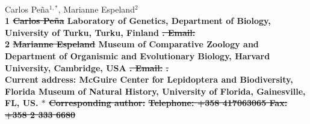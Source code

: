 \documentclass[10pt,letterpaper]{article} %
\date{}
\providecommand{\DIFadd}[1]{{\protect\color{blue}\uwave{#1}}} %
\providecommand{\DIFdel}[1]{{\protect\color{red}\sout{#1}}}                      %
\providecommand{\DIFaddbegin}{} %
\providecommand{\DIFaddend}{} %
\providecommand{\DIFdelbegin}{} %
\providecommand{\DIFdelend}{} %
\begin{document}
\DIFaddbegin \vspace*{0.35in}

\DIFaddend \begin{flushleft}
{\Large
\DIFdelbegin %
\DIFdelend \DIFaddbegin \textbf{}
\DIFaddend }
\DIFdelbegin %
\DIFdelend \DIFaddbegin \newline
\\
\DIFaddend Carlos Pe\~na\DIFdelbegin \DIFdel{$^{1,\ast}$}\DIFdelend \DIFaddbegin \DIFadd{\textsuperscript{1,*}}\DIFaddend ,
Marianne Espeland\DIFdelbegin \DIFdel{$^{2}$
}\DIFdelend \DIFaddbegin \DIFadd{\textsuperscript{2,\textcurrency}
}\DIFaddend \\
\bf{1} \DIFdelbegin \DIFdel{Carlos Pe\~na }\DIFdelend Laboratory of Genetics, Department of Biology, University of Turku, Turku, Finland
\DIFdelbegin \DIFdel{. Email: }%
\DIFdelend \\
\bf{2} \DIFdelbegin \DIFdel{Marianne Espeland }\DIFdelend Museum of Comparative Zoology and Department of Organismic and Evolutionary Biology, Harvard University, Cambridge, USA
\DIFdelbegin \DIFdel{. Email:
}%
\DIFdel{.
}\DIFdelend \DIFaddbegin \\


\DIFadd{\textcurrency }\DIFaddend Current address: McGuire Center for Lepidoptera and Biodiversity,
Florida Museum of Natural History, University of Florida, Gainesville,
FL, US.
\DIFdelbegin %
\DIFdel{$\ast$ }\textbf{\DIFdel{Corresponding author:}}
\DIFdel{Telephone: +358 417063065 Fax: +358 2 333 6680
}\DIFdelend %


\end{flushleft}
\end{document}
